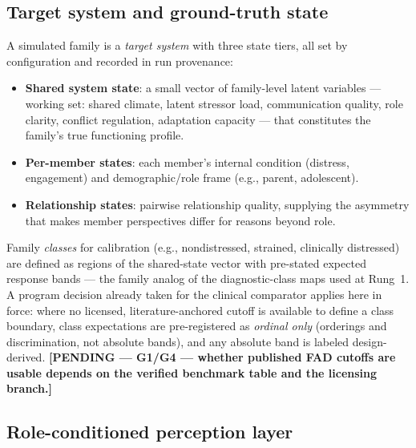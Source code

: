 \documentclass[12pt, letterpaper]{article}
\newcommand{\pending}[1]{\textcolor{blue!55!black}{\textbf{[PENDING --- #1]}}}
\begin{document}
\subsection{Target system and ground-truth state}
\label{sec:groundtruth}

A simulated family is a \emph{target system} with three state tiers, all set by configuration and recorded in run provenance:

\begin{itemize}[nosep]
    \item \textbf{Shared system state}: a small vector of family-level latent variables --- working set: shared climate, latent stressor load, communication quality, role clarity, conflict regulation, adaptation capacity --- that constitutes the family's true functioning profile.
    \item \textbf{Per-member states}: each member's internal condition (distress, engagement) and demographic/role frame (e.g., parent, adolescent).
    \item \textbf{Relationship states}: pairwise relationship quality, supplying the asymmetry that makes member perspectives differ for reasons beyond role.
\end{itemize}

Family \emph{classes} for calibration (e.g., nondistressed, strained, clinically distressed) are defined as regions of the shared-state vector with pre-stated expected response bands --- the family analog of the diagnostic-class maps used at Rung~1. A program decision already taken for the clinical comparator applies here in force: where no licensed, literature-anchored cutoff is available to define a class boundary, class expectations are pre-registered as \emph{ordinal only} (orderings and discrimination, not absolute bands), and any absolute band is labeled design-derived. \pending{G1/G4 --- whether published FAD cutoffs are usable depends on the verified benchmark table and the licensing branch.}

\subsection{Role-conditioned perception layer}
\label{sec:perception}
\end{document}
